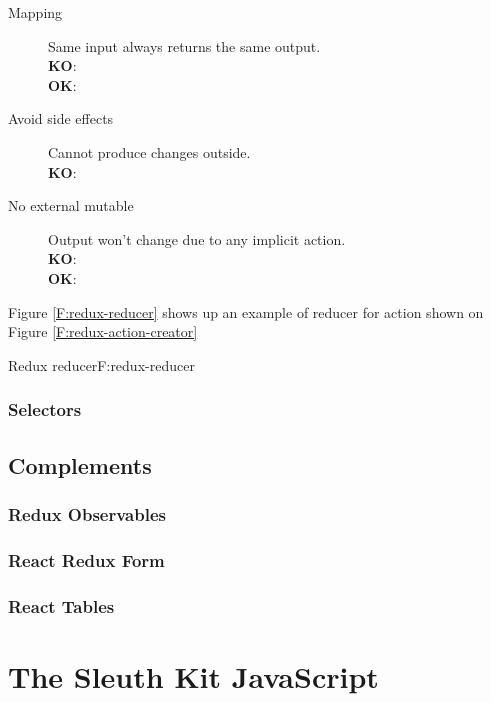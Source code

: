 \begin{description}
	\item [Mapping]
	Same input always returns the same output.\\
		\textbf{KO}: \\
		\textbf{OK}: 

	\item [Avoid side effects]
	Cannot produce changes outside. \\
		\textbf{KO}: \\

	\item [No external mutable]
	Output won't change due to any implicit action.\\
		\textbf{KO}: \\
		\textbf{OK}:  \\
\end{description}

Figure \ref{F:redux-reducer} shows up an example of reducer for action shown on
Figure \ref{F:redux-action-creator}

\begin{codefigure}{Redux reducer}{F:redux-reducer}
\end{codefigure}



\subsubsection{Selectors}

\subsection{Complements}

\subsubsection{Redux Observables}

\subsubsection{React Redux Form}

\subsubsection{React Tables}

\section{The Sleuth Kit JavaScript}

